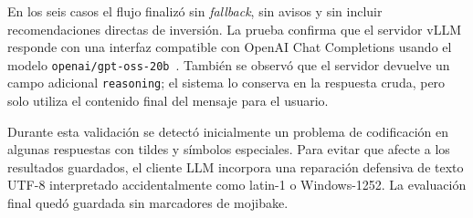 En los seis casos el flujo finalizó sin \textit{fallback}, sin avisos y sin incluir recomendaciones directas de inversión. La prueba confirma que el servidor vLLM responde con una interfaz compatible con OpenAI Chat Completions usando el modelo \texttt{openai/gpt-oss-20b}~\cite{openai2025gptossmodelcard}. También se observó que el servidor devuelve un campo adicional \texttt{reasoning}; el sistema lo conserva en la respuesta cruda, pero solo utiliza el contenido final del mensaje para el usuario.

Durante esta validación se detectó inicialmente un problema de codificación en algunas respuestas con tildes y símbolos especiales. Para evitar que afecte a los resultados guardados, el cliente LLM incorpora una reparación defensiva de texto UTF-8 interpretado accidentalmente como latin-1 o Windows-1252. La evaluación final quedó guardada sin marcadores de mojibake.
